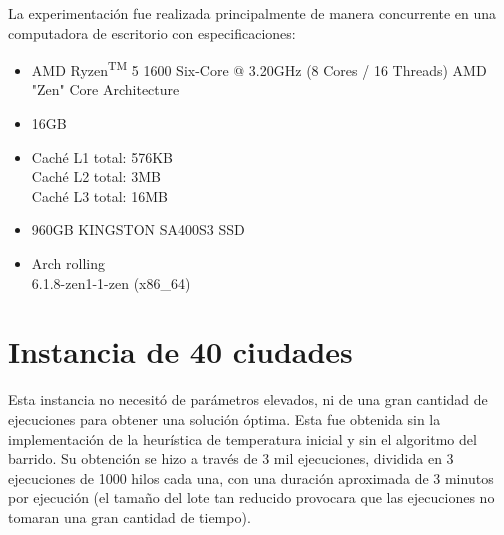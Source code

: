 \documentclass[a4paper]{report}
\begin{document}
La experimentaci\'on fue realizada principalmente de manera concurrente en una computadora de escritorio
con especificaciones:
  \begin{itemize} [label=$\scriptstyle{\scriptstyle{\scriptstyle{\scriptstyle{\square}}}}$]
  \item {} AMD Ryzen\textsuperscript{TM} 5 1600 Six-Core @ 3.20GHz (8 Cores / 16 Threads)
    \makebox[3cm][l]{} AMD "Zen" Core Architecture
  \item {} 16GB
  \item {} Caché L1 total: 576KB\\
    \makebox[5cm][l]{}    Caché L2 total: 3MB\\
    \makebox[5cm][l]{}    Caché L3 total: 16MB
  \item {} 960GB KINGSTON SA400S3 SSD\\
  \item {} Arch rolling\\
     6.1.8-zen1-1-zen (x86\_64)
  \end{itemize}


\section{Instancia de 40 ciudades}
Esta instancia no necesit\'o de par\'ametros elevados, ni de una gran cantidad
de ejecuciones para obtener una soluci\'on \'optima. Esta fue obtenida sin la
implementaci\'on de la heur\'istica de temperatura inicial y sin el algoritmo
del barrido. Su obtenci\'on se hizo a trav\'es de 3 mil ejecuciones, dividida
en 3 ejecuciones de 1000 hilos cada una, con una duraci\'on aproximada de 3
minutos por ejecuci\'on (el tama\~no del lote tan reducido provocara que las
ejecuciones no tomaran una gran cantidad de tiempo).
\end{document}
